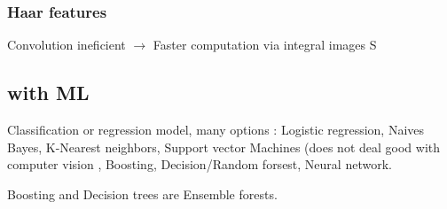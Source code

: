 
	\subsubsection{Haar features} %
	\label{sub:haar_features}
	
	Convolution ineficient $\rightarrow$ Faster computation via integral images S
	
	\subsection{with ML} %
	\label{sub:with_ml}
	

		Classification or regression model, many options : Logistic regression, Naives Bayes, K-Nearest neighbors, Support vector Machines (does not deal good with computer vision , Boosting, Decision/Random forsest, Neural network.

		Boosting and Decision trees are Ensemble forests. 



